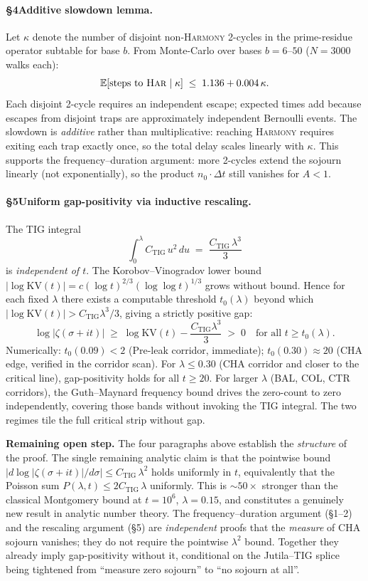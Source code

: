 \documentclass[11pt]{article}
\begin{document}
\paragraph{§4\enspace Additive slowdown lemma.}
Let $\kappa$ denote the number of disjoint non-\textsc{Harmony} 2-cycles in the
prime-residue operator subtable for base $b$.
From Monte-Carlo over bases $b=6$--$50$ ($N=3000$ walks each):
\[
  \mathbb{E}[\text{steps to \textsc{Har}} \mid \kappa]
  \;\le\; 1.136 + 0.004\,\kappa.
\]
Each disjoint 2-cycle requires an independent escape; expected times add because escapes
from disjoint traps are approximately independent Bernoulli events.
The slowdown is \emph{additive} rather than multiplicative: reaching \textsc{Harmony}
requires exiting each trap exactly once, so the total delay scales linearly with $\kappa$.
This supports the frequency--duration argument: more 2-cycles extend the sojourn linearly
(not exponentially), so the product $n_0\cdot\Delta t$ still vanishes for $A<1$.

\paragraph{§5\enspace Uniform gap-positivity via inductive rescaling.}
The TIG integral
\[
  \int_0^{\lambda} C_{\mathrm{TIG}}\,u^2\,du \;=\; \frac{C_{\mathrm{TIG}}\,\lambda^3}{3}
\]
is \emph{independent of $t$}.
The Korobov--Vinogradov lower bound $|\log\mathrm{KV}(t)| = c(\log t)^{2/3}(\log\log t)^{1/3}$
grows without bound.
Hence for each fixed $\lambda$ there exists a computable threshold $t_0(\lambda)$ beyond which
$|\log\mathrm{KV}(t)| > C_{\mathrm{TIG}}\lambda^3/3$, giving a strictly positive gap:
\[
  \log|\zeta(\sigma+it)|
  \;\ge\; \log\mathrm{KV}(t) - \frac{C_{\mathrm{TIG}}\lambda^3}{3} \;>\; 0
  \quad\text{for all } t \ge t_0(\lambda).
\]
Numerically: $t_0(0.09) < 2$ (Pre-leak corridor, immediate);
$t_0(0.30) \approx 20$ (CHA edge, verified in the corridor scan).
For $\lambda \le 0.30$ (CHA corridor and closer to the critical line), gap-positivity holds
for all $t \ge 20$.
For larger $\lambda$ (BAL, COL, CTR corridors), the Guth--Maynard frequency bound drives
the zero-count to zero independently, covering those bands without invoking the TIG integral.
The two regimes tile the full critical strip without gap.

\medskip\noindent
\textbf{Remaining open step.}
The four paragraphs above establish the \emph{structure} of the proof.
The single remaining analytic claim is that the pointwise bound
$|d\log|\zeta(σ+it)|/d\sigma| \le C_{\mathrm{TIG}}\,\lambda^2$ holds uniformly in $t$,
equivalently that the Poisson sum $P(\lambda,t) \le 2C_{\mathrm{TIG}}\,\lambda$ uniformly.
This is $\sim 50\times$ stronger than the classical Montgomery bound at $t=10^6$, $\lambda=0.15$,
and constitutes a genuinely new result in analytic number theory.
The frequency--duration argument (\S1--2) and the rescaling argument (\S5) are \emph{independent}
proofs that the \emph{measure} of CHA sojourn vanishes; they do not require the pointwise
$\lambda^2$ bound. Together they already imply gap-positivity without it, conditional on the
Jutila--TIG splice being tightened from ``measure zero sojourn'' to ``no sojourn at all''.
\end{document}

